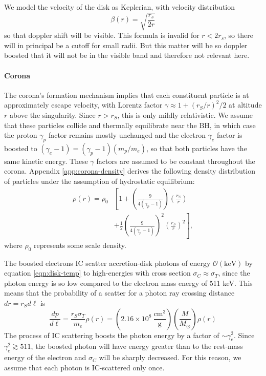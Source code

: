 \documentclass[twocolumn,twocolappendix]{aastex631}
\newcommand{\parens}[1]{\left(#1\right)}
\begin{document}
We model the velocity of the disk as Keplerian, with velocity distribution
\begin{equation}
  \beta(r) = \sqrt{\frac{r_s}{2r}}
\end{equation}
so that doppler shift will be visible. This formula is invalid for $r < 2 r_s$, so there will in principal be a cutoff for small radii. But this matter will be so doppler boosted that it will not be in the visible band and therefore not relevant here.

\paragraph{Corona} The corona's formation mechanism implies that each constituent particle is at approximately escape velocity, with Lorentz factor $\gamma \approx 1 + (r_S/r)^2/2$ at altitude $r$ above the singularity. Since $r > r_S$, this is only mildly relativistic. We assume that these particles collide and thermally equilibrate near the BH, in which case the proton $\gamma_p$ factor remains mostly unchanged and the electron $\gamma_e$ factor is boosted to $(\gamma_e -1) = (\gamma_p - 1) (m_p / m_e)$, so that both particles have the same kinetic energy. These $\gamma$ factors are assumed to be constant throughout the corona. Appendix \ref{app:corona-density} derives the following density distribution of particles under the assumption of hydrostatic equilibrium:
\begin{equation}
  \begin{split}
  \rho(r) = \rho_0 &\left[1 + \parens{\frac{9}{4(\gamma_p-1)}}\parens{\frac{r_S}{r}}\right.\\
  &+ \left. \frac{1}{2}\parens{\frac{9}{4(\gamma_p-1)}}^2\parens{\frac{r_S}{r}}^2\right],
  \end{split}
\end{equation}
where $\rho_0$ represents some scale density.

The boosted electrons IC scatter accretion-disk photons of energy $\mathcal{O}(\text{keV})$ by equation \ref{eqn:disk-temp} to high-energies with cross section $\sigma_C\approx \sigma_T$, since the photon energy is so low compared to the electron mass energy of 511 keV. This means that the probability of a scatter for a photon ray crossing distance $dr = r_S d\ell$ is
\begin{equation}
  \frac{dp}{d\ell} = \frac{r_S \sigma_T}{m_e} \rho(r) = \parens{2.16 \times 10^8\ \frac{\text{cm}^3}{\text{g}}}\parens{\frac{M}{M_\odot}}\rho(r)
\end{equation}
The process of IC scattering boosts the photon energy by a factor of $\sim\gamma_e^2$. Since $\gamma_e^2 \gtrsim 511$, the boosted photon will have energy greater than to the rest-mass energy of the electron and $\sigma_C$ will be sharply decreased. For this reason, we  assume that each photon is IC-scattered only once.
\end{document}
